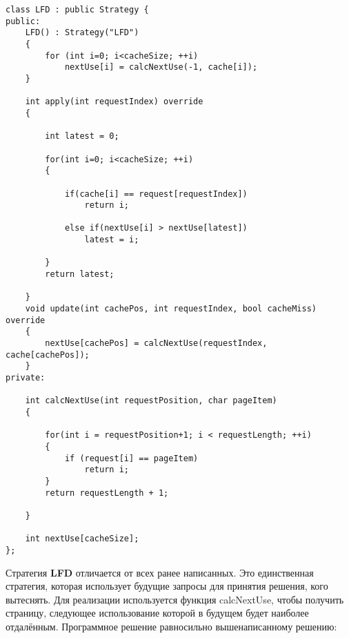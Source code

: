 \begin{tcolorbox}
\begin{verbatim}
class LFD : public Strategy {
public:
	LFD() : Strategy("LFD")
	{
		for (int i=0; i<cacheSize; ++i)
			nextUse[i] = calcNextUse(-1, cache[i]);
	}
	
	int apply(int requestIndex) override
	{
		
		int latest = 0;
		
		for(int i=0; i<cacheSize; ++i)
		{
		
			if(cache[i] == request[requestIndex])
				return i;
			
			else if(nextUse[i] > nextUse[latest])
				latest = i;
		
		}
		return latest;
	
	}
	void update(int cachePos, int requestIndex, bool cacheMiss) override
	{
		nextUse[cachePos] = calcNextUse(requestIndex, cache[cachePos]);
	}
private:

	int calcNextUse(int requestPosition, char pageItem)
	{
	
		for(int i = requestPosition+1; i < requestLength; ++i)
		{
			if (request[i] == pageItem)
				return i;
		}
		return requestLength + 1;
	
	}
	
	int nextUse[cacheSize];
};
\end{verbatim}
\end{tcolorbox}

Стратегия \textbf{LFD} отличается от всех ранее написанных. Это единственная стратегия, которая использует будущие запросы для принятия решения, кого вытеснять. Для реализации используется функция { calcNextUse}, чтобы получить страницу, следующее использование которой в будущем будет наиболее отдалённым. Программное решение равносильно вышенаписанному решению:

